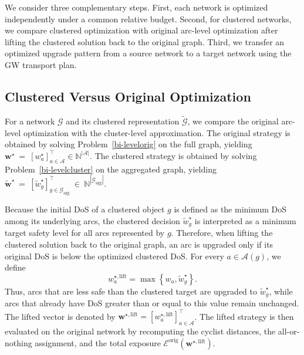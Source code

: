 \documentclass[lettersize,journal]{IEEEtran}
\begin{document}
We consider three complementary steps. First, each network is optimized
independently under a common relative budget. Second, for clustered networks, we
compare clustered optimization with original arc-level optimization after lifting
the clustered solution back to the original graph. Third, we transfer an
optimized upgrade pattern from a source network to a target network using the GW
transport plan.

\subsection{Clustered Versus Original Optimization}
\label{subsec:clustered_vs_original_optimization}

For a network $\mathcal{G}$ and its clustered representation
$\tilde{\mathcal{G}}$, we compare the original arc-level optimization with the
cluster-level approximation. The original strategy is obtained by solving
Problem~\ref{bi-levelorig} on the full graph, yielding $\mathbf{w}^{\star}
~=~\left[
w_a^{\star}
\right]_{a\in\mathcal{A}}^{\top}
\in
\mathbb{N}^{|\mathcal{A}|}$.
The clustered strategy is obtained by solving Problem~\ref{bi-levelcluster} on
the aggregated graph, yielding
$
\tilde{\mathbf{w}}^{\star}~=~\left[
\tilde{w}_g^{\star}
\right]_{g\in\mathcal{G}_{\mathrm{agg}}}^{\top}~\in~\mathbb{N}^{|\mathcal{G}_{\mathrm{agg}}|}.
$

Because the initial DoS of a clustered object $g$ is defined as the minimum DoS
among its underlying arcs, the clustered decision
$\tilde{w}_g^{\star}$ is interpreted as a minimum target safety
level for all arcs represented by $g$. Therefore, when lifting the clustered
solution back to the original graph, an arc is upgraded only if its original DoS
is below the optimized clustered DoS. For every
$a\in\mathcal{A}(g)$, we define
\begin{equation}
\label{eq:lifted_cluster_solution}
w_a^{\star,\mathrm{lift}}
=
\max
\left\{
w_a,
\tilde{w}_g^{\star}
\right\}.
\end{equation}
Thus, arcs that are less safe than the clustered target are upgraded to
$\tilde{w}_g^{\star}$, while arcs that already have DoS greater
than or equal to this value remain unchanged. The lifted vector is denoted by $\mathbf{w}^{\star,\mathrm{lift}}
=
\left[
w_a^{\star,\mathrm{lift}}
\right]_{a\in\mathcal{A}}^{\top}$. The lifted strategy is then evaluated on the original network by recomputing the
cyclist distances, the all-or-nothing assignment, and the total exposure
$\mathcal{E}^{\mathrm{orig}}(\mathbf{w}^{\star,\mathrm{lift}})$.
\end{document}
